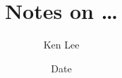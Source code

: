 \documentclass{article}
\begin{document}
\title{Notes on \dots}
\author{Ken Lee}
\date{Date}
\maketitle

\end{document}
